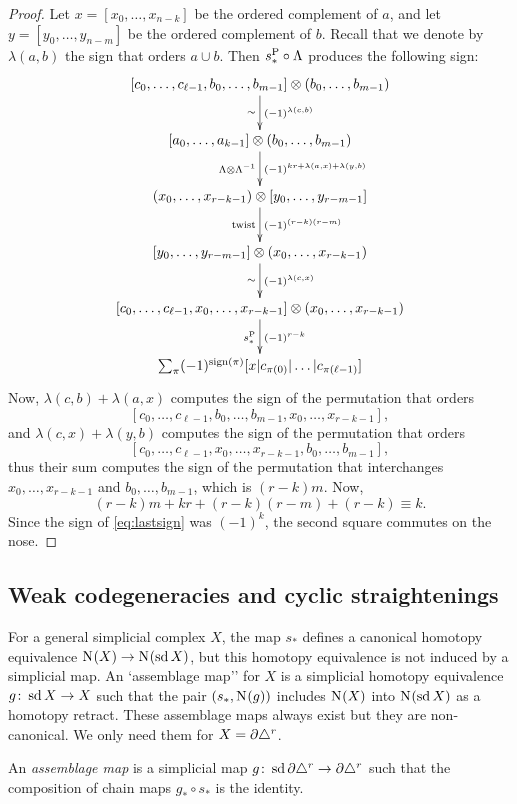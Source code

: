 \begin{proof}
 Let $x=[x_0,\dots,x_{n-k}]$ be the ordered complement of $a$, and let $y=[y_0,\dots,y_{n-m}]$ be the ordered complement of $b$. Recall that we denote by $\lambda(a,b)$ the sign that orders $a\cup b$. Then $s_*^{{\operatorname{P}}}\circ \Lambda$ produces the following sign:
	\[
	\xymatrix{
		 [c_0,\dots,c_{\ell-1},b_0,\dots,b_{m-1}] \ot (b_0,\dots,b_{m-1})
		\ar[d]^-{(-1)^{\lambda(c,b)}}_-{\sim}
		\\
 [a_0,\dots,a_{k-1}] \ot (b_0,\dots,b_{m-1})
		\ar[d]^{(-1)^{kr+\lambda(a,x)+\lambda(y,b)}}_{\alex\ot \alex^{-1}}
		\\
	(x_0,\dots,x_{r-k-1}) \ot [y_0,\dots,y_{r-m-1}]
		\ar[d]^-{(-1)^{(r-k)(r-m)}}_-{\twist}
		\\
		[y_0,\dots,y_{r-m-1}] \ot (x_0,\dots,x_{r-k-1})
		\ar[d]^-{(-1)^{\lambda(c,x)}}_-{\sim}
		\\
		[c_0,\dots,c_{\ell-1},x_0,\dots,x_{r-k-1}] \ot (x_0,\dots,x_{r-k-1}) 
		\ar[d]_{s_*^{\Psd}}^{{(-1)}^{r-k}}
		\\
		\sum_{\perm} (-1)^{\sign{\perm}}[x| c_{\perm(0)}|\dots|c_{\perm(\ell-1)}]
	}
	\]
	Now, $\lambda(c,b) + \lambda(a,x)$ computes the sign of the permutation that orders
	\[
	[c_0,\dots,c_{\ell-1},b_0,\dots,b_{m-1},x_{0},\dots,x_{r-k-1}],
	\]
	and $\lambda(c,x) + \lambda(y,b)$ computes the sign of the permutation that orders
		\[
	[c_0,\dots,c_{\ell-1},x_{0},\dots,x_{r-k-1},b_0,\dots,b_{m-1}],
	\]
	thus their sum computes the sign of the permutation that interchanges $x_0,\ldots,x_{r-k-1}$ and $b_0,\ldots,b_{m-1}$, which is $(r-k)m$. Now,
	\[
	(r-k)m + kr + (r-k)(r-m) + (r-k) \equiv k.
	\]
Since the sign of \eqref{eq:lastsign} was $(-1)^{k}$, the second square commutes on the nose.
\end{proof}



\subsection{Weak codegeneracies and cyclic straightenings}
For a general simplicial complex $X$, the map $s_*$ defines a canonical homotopy equivalence $\operatorname{N}_{}(X)\to \operatorname{N}_{}(\operatorname{sd} X)$, but this homotopy equivalence is not induced by a simplicial map. An `assemblage map'' for $X$ is a simplicial homotopy equivalence $g\colon \operatorname{sd} X\to X$ such that the pair $(s_*,\operatorname{N}_{}(g))$ includes $\operatorname{N}_{}(X)$ into $\operatorname{N}_{}(\operatorname{sd} X)$ as a homotopy retract. These assemblage maps always exist but they are non-canonical. We only need them for $X=\partial\triangle^{r}$.

\begin{definition}
	An \emph{assemblage map} is a simplicial map $g \colon \operatorname{sd} \partial \triangle^{r} \to \partial \triangle^{r}$ such that the composition of chain maps $g_*\circ s_*$ is the identity.
\end{definition}

